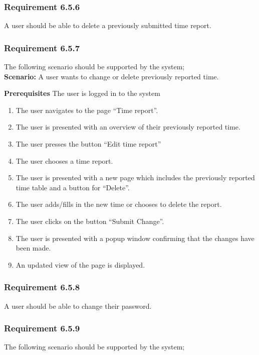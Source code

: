\documentclass{article}
\begin{document}
\subsubsection{Requirement 6.5.6}
A user should be able to delete a previously submitted time report.
\subsubsection{Requirement 6.5.7}
The following scenario should be supported by the system;\\

\textbf{Scenario:} A user wants to change or delete previously reported time.

\textbf{Prerequisites} The user is logged in to the system

\begin{enumerate}

\item The user navigates to the page “Time report”.
\item The user is presented with an overview of their previously reported time. 
\item The user presses the button “Edit time report”
\item The user chooses a time report.
\item The user is presented with a new page which includes the previously reported time table and a button for “Delete”. 
\item The user adds/fills in the new time or chooses to delete the report.
\item The user clicks on the button “Submit Change”.
\item The user is presented with a popup window confirming that the changes have been made.  
\item An updated view of the page is displayed.

\end{enumerate}
\subsubsection{Requirement 6.5.8}
A user should be able to change their password.

\subsubsection{Requirement 6.5.9}
The following scenario should be supported by the system;\\
\end{document}
